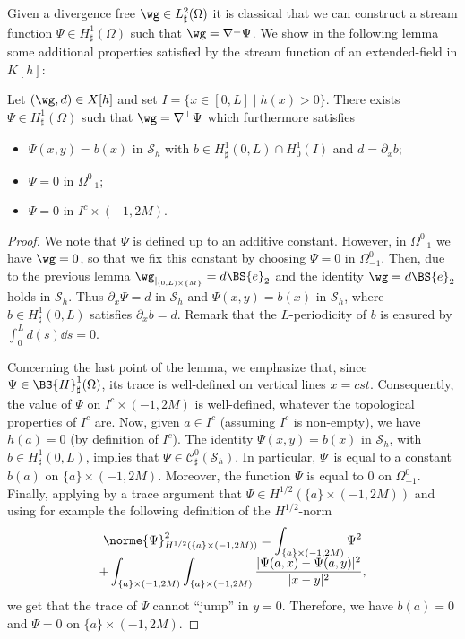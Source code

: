 Given a divergence free $\wg \in {L}^2_{\sharp}(\Omega)$
it is classical that we can construct a stream function $\Psi \in {H}^1_{\sharp}(\Omega)$ such that $\wg = \nabla^{\bot} \Psi$. We show in the following lemma some additional properties satisfied by the stream function of an extended-field in $K[h]$:

\begin{lemma}\label{lemma.X[h]}
Let $(\wg, d)\in X[h]$ and set $I=\{x\in[0,L]\mid h(x)>0\}$. There exists $\Psi \in {H}^1_\sharp(\Omega)$ such that $\wg=\nabla^\perp\Psi$ which furthermore satisfies
\begin{itemize}
\item $\Psi(x,y)=b(x)$ in $\mathcal{S}_h$ with $b\in H^{1}_{\sharp}(0,L) \cap H^{1}_0(I)$ and $d = \partial_x b$;
\item $\Psi =0$ in $\Omega_{-1}^0$;
\item $\Psi=0$ in $I^{c}\times(-1,2M)$.
\end{itemize}
\end{lemma}
\begin{proof}
We note that $\Psi$ is defined up to an additive constant.
However, in $\Omega_{-1}^0$ we have $\wg=0$, so that we fix this constant by choosing $\Psi=0$ in $\Omega_{-1}^0$. Then,
due to the previous lemma $\wg_{\vert_{(0, L)\times \{M\}}}= d\BS{e}_{2}$ and the identity $\wg=d\BS{e}_{2}$ holds in $\mathcal{S}_{h}$. Thus $\partial_{x}\Psi=d$ in $\mathcal{S}_{h}$ and $\Psi(x,y)=b(x)$ in $\mathcal{S}_{h}$, where $b\in H^{1}_{\sharp}(0,L)$ satisfies $\partial_x b = d$. Remark that the $L$-periodicity of $b$ is ensured by $\int_{0}^{L}d(s)\dd s =0$.

Concerning the last point of the lemma, we emphasize that,
since $\Psi \in \BS{H}^1_{\sharp}(\Omega)$, its trace is well-defined
on vertical lines $x=cst$. Consequently, the value of $\Psi$
on $I^{c} \times (-1,2M)$ is well-defined, whatever the topological properties of $I^c$ are. Now, given $a \in I^{c}$ (assuming $I^{c}$ is non-empty), we have $h(a)=0$ (by definition of $I^c$). The identity $\Psi(x,y)=b(x)$ in $ \mathcal{S}_{h}$, with $b\in H^{1}_{\sharp}(0,L)$, implies that $\Psi\in\mathcal{C}_\sharp^{0}(\mathcal{S}_{h})$. In particular, $\Psi$~is equal to a constant $b(a)$ on $\{a\}\times(-1,2M)$. Moreover, the function $\Psi$ is equal to $0$ on $\Omega_{-1}^{0}$.
Finally, applying by a trace argument that $\Psi \in H^{1/2}(\{a\}\times (-1,2M))$ and using for example the following definition of the $H^{1/2}$-norm\vspace*{-3pt}
\begin{multline*}\norme{\Psi}_{H^{1/2}(\{a\}\times(-1,2M))}^{2} = \int_{\{a\}\times(-1,2M)}\Psi^{2} \\[-5pt]
+ \int_{\{a\}\times(-1,2M)}\int_{\{a\}\times(-1,2M)}\frac{\vert\Psi(a,x)-\Psi(a,y)\vert^{2}}{\vert x-y\vert^{2}},
\end{multline*}
we get that the trace of $\Psi$ cannot ``jump'' in $y=0$.
Therefore, we have $b(a)=0$ and $\Psi=0$ on $\{a\}\times(-1,2M)$.
\end{proof}

